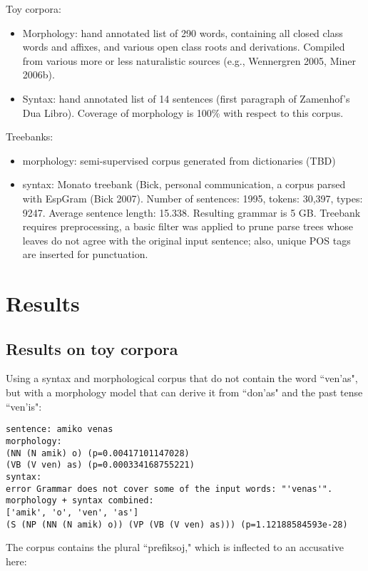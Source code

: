 \documentclass[10pt,a4paper]{article}
\begin{document}
Toy corpora:

\begin{itemize}
\item Morphology: hand annotated list of 290 words, containing all closed class
      words and affixes, and various open class roots and derivations. Compiled
      from various more or less naturalistic sources (e.g., Wennergren 2005,
      Miner 2006b).
\item Syntax: hand annotated list of 14 sentences (first paragraph of
      Zamenhof's Dua Libro). Coverage of morphology is 100\% with respect to
      this corpus.
\end{itemize}

Treebanks:

\begin{itemize}
\item morphology: semi-supervised corpus generated from dictionaries (TBD)
\item syntax: Monato treebank (Bick, personal communication, a corpus parsed
      with EspGram (Bick 2007).  Number of sentences: 1995, tokens: 30,397,
      types: 9247. Average sentence length: 15.338. Resulting grammar is 5 GB.
      Treebank requires preprocessing, a basic filter was applied to prune
      parse trees whose leaves do not agree with the original input sentence;
      also, unique POS tags are inserted for punctuation.
\end{itemize}

\section{Results}
\subsection{Results on toy corpora}

Using a syntax and morphological corpus that do not contain the word ``ven'as",
but with a morphology model that can derive it from ``don'as" and the past
tense ``ven'is":

\begin{verbatim}
sentence: amiko venas
morphology:
(NN (N amik) o) (p=0.00417101147028)
(VB (V ven) as) (p=0.000334168755221)
syntax:
error Grammar does not cover some of the input words: "'venas'".
morphology + syntax combined:
['amik', 'o', 'ven', 'as']
(S (NP (NN (N amik) o)) (VP (VB (V ven) as))) (p=1.12188584593e-28)
\end{verbatim}

The corpus contains the plural ``prefiksoj," which is inflected to an accusative here:
\end{document}
